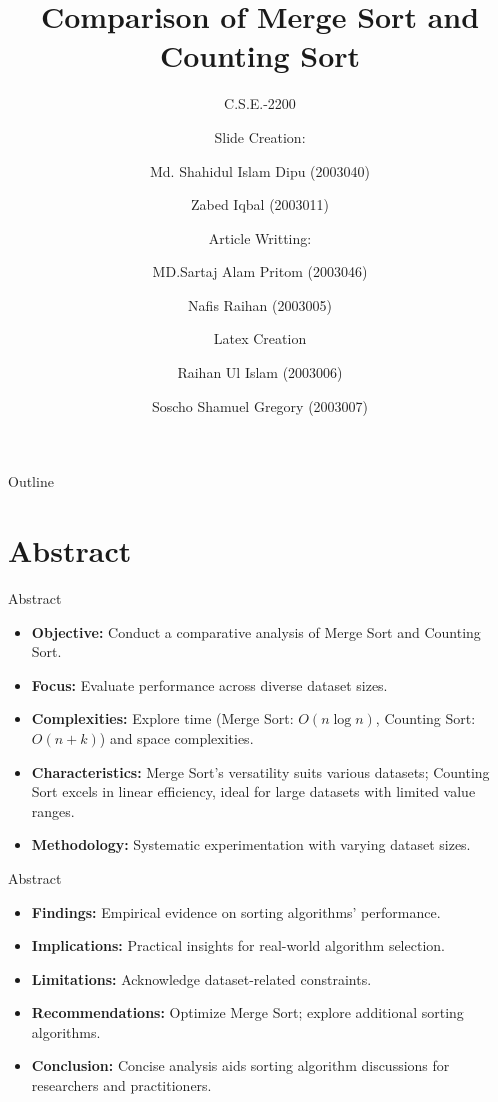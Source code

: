 \documentclass{beamer}
\title{Comparison of Merge Sort and Counting Sort}
\subtitle{C.S.E.-2200}
\author[Md. Shahidul Islam Dipu \and Zabed Iqbal]{Slide Creation:\newline\and  Md. Shahidul Islam Dipu (2003040) \newline\and Zabed Iqbal (2003011)\newline \newline\and Article Writting:\newline\and
MD.Sartaj Alam Pritom (2003046) \newline\and Nafis Raihan (2003005)
\newline\and \newline Latex Creation \newline\and Raihan Ul Islam (2003006)
\newline\and Soscho Shamuel Gregory (2003007)\newline}
\begin{document}
	
	\begin{frame}
		\titlepage
	\end{frame}
	
	\begin{frame}{Outline}
		\tableofcontents
	\end{frame}
	
	\section{Abstract}
	
	\begin{frame}{Abstract}
		\begin{itemize}
			\item \textbf{Objective:} Conduct a comparative analysis of Merge Sort and Counting Sort.
			
			\item \textbf{Focus:} Evaluate performance across diverse dataset sizes.
			
			\item \textbf{Complexities:} Explore time (Merge Sort: $O(n \log n)$, Counting Sort: $O(n + k)$) and space complexities.
			
			\item \textbf{Characteristics:} Merge Sort's versatility suits various datasets; Counting Sort excels in linear efficiency, ideal for large datasets with limited value ranges.
			
			\item \textbf{Methodology:} Systematic experimentation with varying dataset sizes.
		\end{itemize}
	\end{frame}
	
	\begin{frame}{Abstract}
		\begin{itemize}
			\item \textbf{Findings:} Empirical evidence on sorting algorithms' performance.
			
			\item \textbf{Implications:} Practical insights for real-world algorithm selection.
			
			\item \textbf{Limitations:} Acknowledge dataset-related constraints.
			
			\item \textbf{Recommendations:} Optimize Merge Sort; explore additional sorting algorithms.
			
			\item \textbf{Conclusion:} Concise analysis aids sorting algorithm discussions for researchers and practitioners.
		\end{itemize}
	\end{frame}
	
\end{document}

